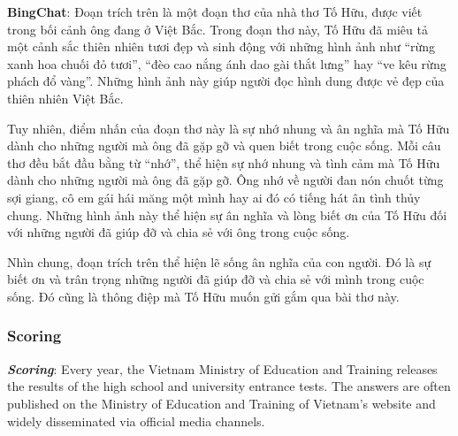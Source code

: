 \documentclass{article}
\begin{document}
{\begin{mdframed}[linewidth=1pt,linecolor=red]
		\textbf{BingChat}: Đoạn trích trên là một đoạn thơ của nhà thơ Tố Hữu, được viết trong bối cảnh ông đang ở Việt Bắc. Trong đoạn thơ này, Tố Hữu đã miêu tả một cảnh sắc thiên nhiên tươi đẹp và sinh động với những hình ảnh như “rừng xanh hoa chuối đỏ tươi”, “đèo cao nắng ánh dao gài thắt lưng” hay “ve kêu rừng phách đổ vàng”. Những hình ảnh này giúp người đọc hình dung được vẻ đẹp của thiên nhiên Việt Bắc.
		
		Tuy nhiên, điểm nhấn của đoạn thơ này là sự nhớ nhung và ân nghĩa mà Tố Hữu dành cho những người mà ông đã gặp gỡ và quen biết trong cuộc sống. Mỗi câu thơ đều bắt đầu bằng từ “nhớ”, thể hiện sự nhớ nhung và tình cảm mà Tố Hữu dành cho những người mà ông đã gặp gỡ. Ông nhớ về người đan nón chuốt từng sợi giang, cô em gái hái măng một mình hay ai đó có tiếng hát ân tình thủy chung. Những hình ảnh này thể hiện sự ân nghĩa và lòng biết ơn của Tố Hữu đối với những người đã giúp đỡ và chia sẻ với ông trong cuộc sống.
		
		Nhìn chung, đoạn trích trên thể hiện lẽ sống ân nghĩa của con người. Đó là sự biết ơn và trân trọng những người đã giúp đỡ và chia sẻ với mình trong cuộc sống. Đó cũng là thông điệp mà Tố Hữu muốn gửi gắm qua bài thơ này.
		
		
	\end{mdframed}
	
	\subsubsection{Scoring}
	\label{VNHSGE_Lit_S}
	
	\textit{\textbf{Scoring}}: Every year, the Vietnam Ministry of Education and Training releases the results of the high school and university entrance tests. The answers are often published on the Ministry of Education and Training of Vietnam's website and widely disseminated via official media channels.
	
	
	\begingroup
	\renewcommand{\arraystretch}{1.25} 

}
\end{document}
